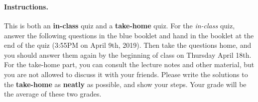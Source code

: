 \documentclass[12pt]{article}
\begin{document}

 \\
~\\

\paragraph{Instructions.} This is both an {\bf in-class} quiz  and a {\bf take-home} quiz. For the {\it in-class} quiz, answer the following questions in the blue booklet and hand in the booklet at the end of the quiz (3:55PM on April 9th, 2019). Then take the questions home, and you should answer them again by the beginning of class on Thursday April 18th. For the  take-home part, you can consult the lecture notes and other material, but you are not allowed to discuss it with your friends. Please write the solutions to the {\bf take-home} as {\bf neatly} as possible, and show your steps. Your grade will be the average of these two grades. 
\end{document}
